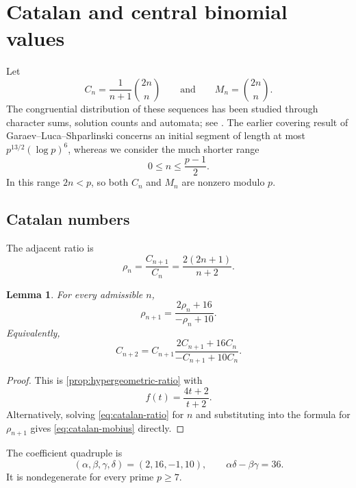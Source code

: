 \documentclass[11pt,reqno]{amsart}
\numberwithin{equation}{section}
\newtheorem{lemma}[lemma]{Lemma}
\theoremstyle{definition}
\theoremstyle{remark}
\begin{document}
\section{Catalan and central binomial values}\label{sec:catalan}

Let
\[
  C_n=\frac1{n+1}\binom{2n}{n}
  \qquad\text{and}\qquad
  M_n=\binom{2n}{n}.
\]
The congruential distribution of these sequences has been studied through character sums, solution counts and automata; see \cite{GaraevLucaShparlinski2006,GaraevLucaShparlinski2007,Burns2017}.  The earlier covering result of Garaev--Luca--Shparlinski concerns an initial segment of length at most $p^{13/2}(\log p)^6$, whereas we consider the much shorter range
\[
  0\le n\le\frac{p-1}{2}.
\]
In this range $2n<p$, so both $C_n$ and $M_n$ are nonzero modulo $p$.

\subsection{Catalan numbers}

The adjacent ratio is
\begin{equation}\label{eq:catalan-ratio}
  \rho_n=\frac{C_{n+1}}{C_n}
  =\frac{2(2n+1)}{n+2}.
\end{equation}

\begin{lemma}\label{lem:catalan-ratio}
For every admissible $n$,
\begin{equation}\label{eq:catalan-mobius}
  \rho_{n+1}=\frac{2\rho_n+16}{-\rho_n+10}.
\end{equation}
Equivalently,
\begin{equation}\label{eq:catalan-transition}
  C_{n+2}
  =C_{n+1}\frac{2C_{n+1}+16C_n}{-C_{n+1}+10C_n}.
\end{equation}
\end{lemma}

\begin{proof}
This is \cref{prop:hypergeometric-ratio} with
\[
  f(t)=\frac{4t+2}{t+2}.
\]
Alternatively, solving \eqref{eq:catalan-ratio} for $n$ and substituting into the formula for $\rho_{n+1}$ gives \eqref{eq:catalan-mobius} directly.
\end{proof}

The coefficient quadruple is
\begin{equation}\label{eq:catalan-coefficients}
  (\alpha,\beta,\gamma,\delta)=(2,16,-1,10),
  \qquad
  \alpha\delta-\beta\gamma=36.
\end{equation}
It is nondegenerate for every prime $p\ge7$.
\end{document}

